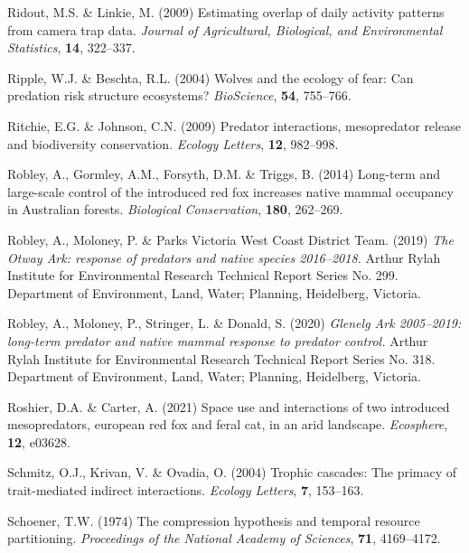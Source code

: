 \documentclass[]{elsarticle} %
\begin{document}
\leavevmode\hypertarget{ref-ridout2009estimating}{}%
Ridout, M.S. \& Linkie, M. (2009) Estimating overlap of daily activity patterns from camera trap data. \emph{Journal of Agricultural, Biological, and Environmental Statistics}, \textbf{14}, 322--337.

\leavevmode\hypertarget{ref-ripple2004wolves}{}%
Ripple, W.J. \& Beschta, R.L. (2004) Wolves and the ecology of fear: Can predation risk structure ecosystems? \emph{BioScience}, \textbf{54}, 755--766.

\leavevmode\hypertarget{ref-ritchie2009predator}{}%
Ritchie, E.G. \& Johnson, C.N. (2009) Predator interactions, mesopredator release and biodiversity conservation. \emph{Ecology Letters}, \textbf{12}, 982--998.

\leavevmode\hypertarget{ref-robley2014long}{}%
Robley, A., Gormley, A.M., Forsyth, D.M. \& Triggs, B. (2014) Long-term and large-scale control of the introduced red fox increases native mammal occupancy in Australian forests. \emph{Biological Conservation}, \textbf{180}, 262--269.

\leavevmode\hypertarget{ref-robley2019otway}{}%
Robley, A., Moloney, P. \& Parks Victoria West Coast District Team. (2019) \emph{The Otway Ark: response of predators and native species 2016--2018.} Arthur Rylah Institute for Environmental Research Technical Report Series No. 299. Department of Environment, Land, Water; Planning, Heidelberg, Victoria.

\leavevmode\hypertarget{ref-robley2020glenelg}{}%
Robley, A., Moloney, P., Stringer, L. \& Donald, S. (2020) \emph{Glenelg Ark 2005--2019: long-term predator and native mammal response to predator control.} Arthur Rylah Institute for Environmental Research Technical Report Series No. 318. Department of Environment, Land, Water; Planning, Heidelberg, Victoria.

\leavevmode\hypertarget{ref-roshier2021space}{}%
Roshier, D.A. \& Carter, A. (2021) Space use and interactions of two introduced mesopredators, european red fox and feral cat, in an arid landscape. \emph{Ecosphere}, \textbf{12}, e03628.

\leavevmode\hypertarget{ref-schmitz2004trophic}{}%
Schmitz, O.J., Krivan, V. \& Ovadia, O. (2004) Trophic cascades: The primacy of trait-mediated indirect interactions. \emph{Ecology Letters}, \textbf{7}, 153--163.

\leavevmode\hypertarget{ref-schoener1974compression}{}%
Schoener, T.W. (1974) The compression hypothesis and temporal resource partitioning. \emph{Proceedings of the National Academy of Sciences}, \textbf{71}, 4169--4172.
\end{document}
